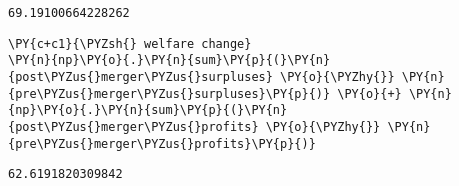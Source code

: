             \begin{tcolorbox}[breakable, size=fbox, boxrule=.5pt, pad at break*=1mm, opacityfill=0]
\begin{Verbatim}[commandchars=\\\{\}]
69.19100664228262
\end{Verbatim}
\end{tcolorbox}

    \begin{tcolorbox}[breakable, size=fbox, boxrule=1pt, pad at break*=1mm,colback=cellbackground, colframe=cellborder]
\begin{Verbatim}[commandchars=\\\{\}]
\PY{c+c1}{\PYZsh{} welfare change}
\PY{n}{np}\PY{o}{.}\PY{n}{sum}\PY{p}{(}\PY{n}{post\PYZus{}merger\PYZus{}surpluses} \PY{o}{\PYZhy{}} \PY{n}{pre\PYZus{}merger\PYZus{}surpluses}\PY{p}{)} \PY{o}{+} \PY{n}{np}\PY{o}{.}\PY{n}{sum}\PY{p}{(}\PY{n}{post\PYZus{}merger\PYZus{}profits} \PY{o}{\PYZhy{}} \PY{n}{pre\PYZus{}merger\PYZus{}profits}\PY{p}{)}
\end{Verbatim}
\end{tcolorbox}

            \begin{tcolorbox}[breakable, size=fbox, boxrule=.5pt, pad at break*=1mm, opacityfill=0]
\begin{Verbatim}[commandchars=\\\{\}]
62.6191820309842
\end{Verbatim}
\end{tcolorbox}
